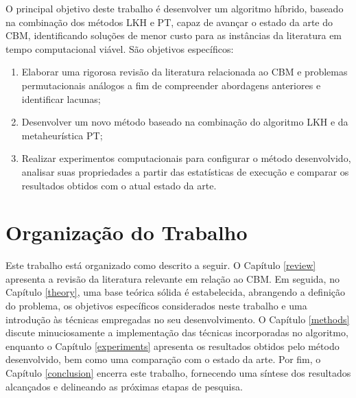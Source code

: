 O principal objetivo deste trabalho é desenvolver um algoritmo híbrido, baseado na combinação dos métodos LKH e PT, capaz de avançar o estado da arte do CBM, identificando soluções de menor custo para as instâncias da literatura em tempo computacional viável. São objetivos específicos:

\begin{enumerate}
    \item Elaborar uma rigorosa revisão da literatura relacionada ao CBM e problemas permutacionais análogos a fim de compreender abordagens anteriores e identificar lacunas;
    \item Desenvolver um novo método baseado na combinação do algoritmo LKH e da metaheurística PT;
    \item Realizar experimentos computacionais para configurar o método desenvolvido, analisar suas propriedades a partir das estatísticas de execução e comparar os resultados obtidos com o atual estado da arte.
\end{enumerate}

\section{Organização do Trabalho}

Este trabalho está organizado como descrito a seguir. O Capítulo \ref{review} apresenta a revisão da literatura relevante em relação ao CBM. Em seguida, no Capítulo \ref{theory}, uma base teórica sólida é estabelecida, abrangendo a definição do problema, os objetivos específicos considerados neste trabalho e uma introdução às técnicas empregadas no seu desenvolvimento. O Capítulo \ref{methods} discute minuciosamente a implementação das técnicas incorporadas no algoritmo, enquanto o Capítulo \ref{experiments} apresenta os resultados obtidos pelo método desenvolvido, bem como uma comparação com o estado da arte. Por fim, o Capítulo \ref{conclusion} encerra este trabalho, fornecendo uma síntese dos resultados alcançados e delineando as próximas etapas de pesquisa.